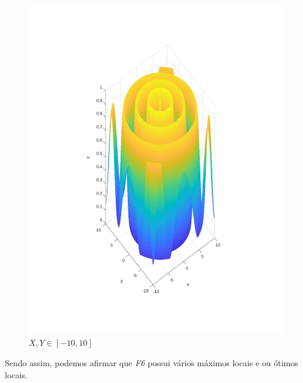 \documentclass{article}
\begin{document}
\begin{figure}[h!]
\centering
\includegraphics[scale=.5]{images/myplot5b.pdf}
\caption{$X,Y \in [-10, 10]$}
\label{fig:plot5b_f6}
\end{figure}

\newpage
Sendo assim, podemos afirmar que \emph{F6} possui vários máximos locais e ou ótimos locais.
\end{document}

